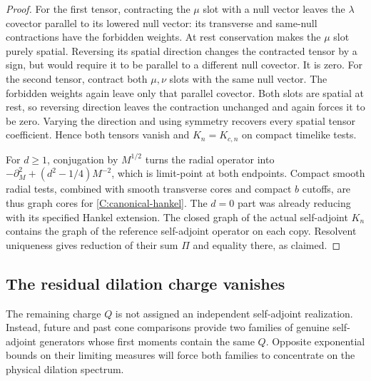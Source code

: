 \begin{proof}
For the first tensor, contracting the $\mu$ slot with a null
vector leaves the $\lambda$ covector parallel to its lowered
null vector: its transverse and same-null contractions have
the forbidden weights. At rest conservation makes the
$\mu$ slot purely spatial. Reversing its spatial direction
changes the contracted tensor by a sign, but would require
it to be parallel to a different null covector. It is zero.
For the second tensor, contract both $\mu,\nu$ slots with
the same null vector. The forbidden weights again leave
only that parallel covector. Both slots are spatial at rest,
so reversing direction leaves the contraction unchanged and
again forces it to be zero. Varying the direction and using
symmetry recovers every spatial tensor coefficient. Hence
both tensors vanish and $K_n=K_{c,n}$ on compact timelike
tests.

For $d\ge1$, conjugation by $M^{1/2}$ turns the radial
operator into
$-\partial_M^2+(d^2-1/4)M^{-2}$, which is limit-point at
both endpoints. Compact smooth radial tests, combined with
smooth transverse cores and compact $b$ cutoffs, are thus
graph cores for \eqref{C:canonical-hankel}. The $d=0$ part
was already reducing with its specified Hankel extension.
The closed graph of the actual self-adjoint $K_n$ contains
the graph of the reference self-adjoint operator on each
copy. Resolvent uniqueness gives reduction of their sum
$\Pi$ and equality there, as claimed.
\end{proof}

\subsection{The residual dilation charge vanishes}

The remaining charge $Q$ is not assigned an independent
self-adjoint realization.  Instead, future and past cone comparisons
provide two families of genuine self-adjoint generators whose first
moments contain the same $Q$.  Opposite exponential bounds on their
limiting measures will force both families to concentrate on the
physical dilation spectrum.

